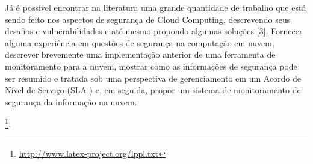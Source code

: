 Já é possível encontrar na literatura uma grande quantidade de trabalho que está
sendo feito nos aspectos de segurança de Cloud Computing, descrevendo seus
desafios e vulnerabilidades e até mesmo propondo algumas soluções [3]. Fornecer
alguma experiência em questões de segurança na computação em nuvem, descrever
brevemente uma implementação anterior de uma ferramenta de monitoramento para a
nuvem, mostrar como as informações de segurança pode ser resumido e tratada sob
uma perspectiva de gerenciamento em um Acordo de Nível de Serviço (SLA ) e, em
seguida, propor um sistema de monitoramento de segurança da informação na nuvem.



\footnote{\url{http://www.latex-project.org/lppl.txt}}.

